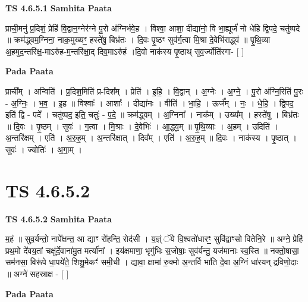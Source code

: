 \documentclass[17pt]{extarticle}
\begin{document}
\textbf{TS 4.6.5.1 } \newline
\textbf{Samhita Paata} \newline

प्राची॒मनु॑ प्र॒दिशं॒ प्रेहि॑ वि॒द्वान॒ग्नेर॑ग्ने पु॒रो अ॑ग्निर्भवे॒ह । विश्वा॒ आशा॒ दीद्या॑नो॒ वि भा॒ह्यूर्जं॑ नो धेहि द्वि॒पदे॒ चतु॑ष्पदे ॥ क्रम॑द्ध्वम॒ग्निना॒ नाक॒मुख्यꣳ॒॒ हस्ते॑षु॒ बिभ्र॑तः । दि॒वः पृ॒ष्ठꣳ सुव॑र्ग॒त्वा मि॒श्रा दे॒वेभि॑राद्ध्वं ॥ पृ॒थि॒व्या अ॒हमुद॒न्तरि॑क्ष॒-माऽरु॑ह-म॒न्तरि॑क्षा॒द् दिव॒माऽरु॑हं ।दि॒वो नाक॑स्य पृ॒ष्ठाथ् सुव॒र्ज्योति॑रगा- [  ] \newline

\textbf{Pada Paata} \newline

प्राची᳚म् । अन्विति॑ । प्र॒दिश॒मिति॑ प्र-दिश᳚म् । प्रेति॑ । इ॒हि॒ । वि॒द्वान् । अ॒ग्नेः । अ॒ग्ने॒ । पु॒रो अ॑ग्नि॒रिति॑ पु॒रः - अ॒ग्निः॒ । भ॒व॒ । इ॒ह ॥ विश्वाः᳚ । आशाः᳚ । दीद्या॑नः । वीति॑ । भा॒हि॒ । ऊर्ज᳚म् । नः॒ । धे॒हि॒ । द्वि॒पद॒ इति॑ द्वि - पदे᳚ । चतु॑ष्पद॒ इति॒ चतुः॑ - प॒दे॒ ॥ क्रम॑द्ध्वम् । अ॒ग्निना᳚ । नाक᳚म् । उख्य᳚म् । हस्ते॑षु । बिभ्र॑तः ॥ दि॒वः । पृ॒ष्ठम् । सुवः॑ । ग॒त्वा । मि॒श्राः । दे॒वेभिः॑ । आ॒द्ध्व॒म् ॥ पृ॒थि॒व्याः । अ॒हम् । उदिति॑ । अ॒न्तरि॑क्षम् । एति॑ । अ॒रु॒ह॒म् । अ॒न्तरि॑क्षात् । दिव᳚म् । एति॑ । अ॒रु॒ह॒म् ॥ दि॒वः । नाक॑स्य । पृ॒ष्ठात् । सुवः॑ । ज्योतिः॑ । अ॒गा॒म् ।  \newline




\section*{ TS 4.6.5.2 }

\textbf{TS 4.6.5.2 } \newline
\textbf{Samhita Paata} \newline

म॒हं ॥ सुव॒र्यन्तो॒ नापे᳚क्षन्त॒ आ द्याꣳ रो॑हन्ति॒ रोद॑सी । य॒ज्ञ्ं ॅये वि॒श्वतो॑धारꣳ॒॒ सुवि॑द्वाꣳसो वितेनि॒रे ॥ अग्ने॒ प्रेहि॑ प्रथ॒मो दे॑वय॒तां चक्षु॑र्दे॒वाना॑मु॒त मर्त्या॑नां । इय॑क्षमाणा॒ भृगु॑भिः स॒जोषाः॒ सुव॑र्यन्तु॒ यज॑मानाः स्व॒स्ति ॥ नक्तो॒षासा॒ सम॑नसा॒ विरू॑पे धा॒पये॑ते॒ शिशु॒मेकꣳ॑ समी॒ची । द्यावा॒ क्षामा॑ रु॒क्मो अ॒न्तर्वि भा॑ति दे॒वा अ॒ग्निं धा॑रयन् द्रविणो॒दाः ॥ अग्ने॑ सहस्राक्ष - [  ] \newline

\textbf{Pada Paata} \newline
\end{document}
